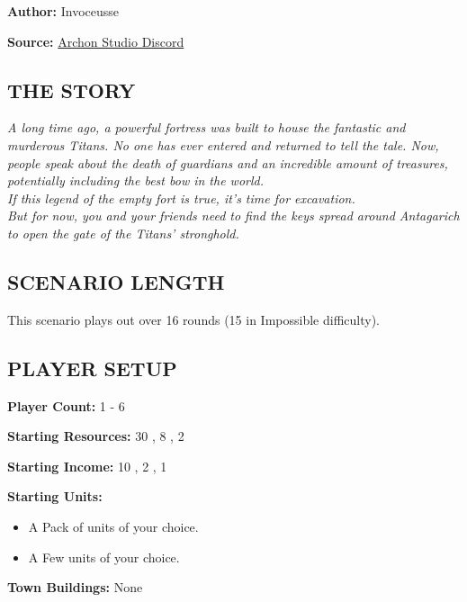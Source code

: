 
\begin{multicols*}{2}

\textbf{Author:} Invoceusse

\textbf{Source:} \href{https://discord.com/channels/740870068178649108/1219333721019256943}{Archon Studio Discord}

\subsection*{\MakeUppercase{The story}}
\textit{A long time ago, a powerful fortress was built to house the fantastic and murderous Titans.
  No one has ever entered and returned to tell the tale.
  Now, people speak about the death of guardians and an incredible amount of treasures, potentially including the best bow in the world.\\
  If this legend of the empty fort is true, it's time for excavation.\\
  But for now, you and your friends need to find the keys spread around Antagarich to open the gate of the Titans' stronghold.
}
\subsection*{\MakeUppercase{Scenario length}}

This scenario plays out over 16 rounds (15 in Impossible difficulty).

\subsection*{\MakeUppercase{Player setup}}

\textbf{Player Count:} 1 - 6

\textbf{Starting Resources:} 30 , 8 , 2 

\textbf{Starting Income:} 10 , 2 , 1 

\textbf{Starting Units:} 
\begin{itemize}
  \item A Pack of  units of your choice.
  \item A Few  units of your choice.
\end{itemize}

\textbf{Town Buildings:} None


\end{multicols*}
